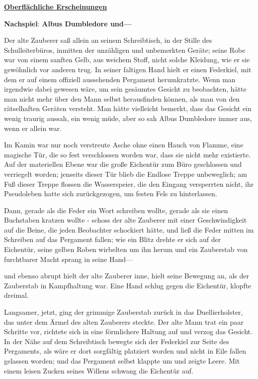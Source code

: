 

\hypertarget{oberfluxe4chliche-erscheinungen}{%

\textbf{\uline{Oberflächliche Erscheinungen}}

\textbf{Nachspiel}: \textbf{Albus Dumbledore und—}

Der alte Zauberer saß allein an seinem Schreibtisch, in der Stille des Schulleiterbüros, inmitten der unzähligen und unbemerkten Geräte; seine Robe war von einem sanften Gelb, aus weichem Stoff, nicht solche Kleidung, wie er sie gewöhnlich vor anderen trug. In seiner faltigen Hand hielt er einen Federkiel, mit dem er auf einem offiziell aussehenden Pergament herumkratzte. Wenn man irgendwie dabei gewesen wäre, um sein gesäumtes Gesicht zu beobachten, hätte man nicht mehr über den Mann selbst herausfinden können, als man von den rätselhaften Geräten versteht. Man hätte vielleicht bemerkt, dass das Gesicht ein wenig traurig aussah, ein wenig müde, aber so sah Albus Dumbledore immer aus, wenn er allein war.

Im Kamin war nur noch verstreute Asche ohne einen Hauch von Flamme, eine magische Tür, die so fest verschlossen worden war, dass sie nicht mehr existierte. Auf der materiellen Ebene war die große Eichentür zum Büro geschlossen und verriegelt worden; jenseits dieser Tür blieb die Endlose Treppe unbeweglich; am Fuß dieser Treppe flossen die Wasserspeier, die den Eingang versperrten nicht, ihr Pseudoleben hatte sich zurückgezogen, um festen Fels zu hinterlassen.

Dann, gerade als die Feder ein Wort schreiben wollte, gerade als sie einen Buchstaben kratzen wollte - schoss der alte Zauberer mit einer Geschwindigkeit auf die Beine, die jeden Beobachter schockiert hätte, und ließ die Feder mitten im Schreiben auf das Pergament fallen; wie ein Blitz drehte er sich auf der Eichentür, seine gelben Roben wirbelten um ihn herum und ein Zauberstab von furchtbarer Macht sprang in seine Hand—

und ebenso abrupt hielt der alte Zauberer inne, hielt seine Bewegung an, als der Zauberstab in Kampfhaltung war. Eine Hand schlug gegen die Eichentür, klopfte dreimal.

Langsamer, jetzt, ging der grimmige Zauberstab zurück in das Duellierholster, das unter dem Ärmel des alten Zauberers steckte. Der alte Mann trat ein paar Schritte vor, richtete sich in eine förmlichere Haltung auf und verzog das Gesicht. In der Nähe auf dem Schreibtisch bewegte sich der Federkiel zur Seite des Pergaments, als wäre er dort sorgfältig platziert worden und nicht in Eile fallen gelassen worden; und das Pergament selbst klappte um und zeigte Leere. Mit einem leisen Zucken seines Willens schwang die Eichentür auf.

}
